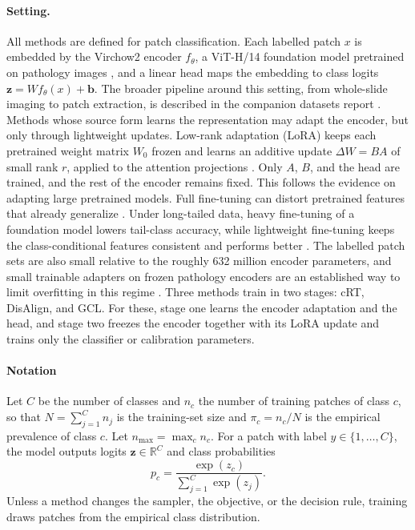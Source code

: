\documentclass[11pt]{article}
\begin{document}
\paragraph{Setting.}
All methods are defined for patch classification. Each labelled patch $x$ is embedded by the Virchow2 encoder $f_\theta$, a ViT-H/14 foundation model pretrained on pathology images \citep{zimmermann2024virchow2}, and a linear head maps the embedding to class logits $\mathbf z=W f_\theta(x)+\mathbf b$. The broader pipeline around this setting, from whole-slide imaging to patch extraction, is described in the companion datasets report \citep{queisler2026datasets}. Methods whose source form learns the representation may adapt the encoder, but only through lightweight updates. Low-rank adaptation (LoRA) keeps each pretrained weight matrix $W_0$ frozen and learns an additive update $\Delta W=BA$ of small rank $r$, applied to the attention projections \citep{hu2022lora}. Only $A$, $B$, and the head are trained, and the rest of the encoder remains fixed. This follows the evidence on adapting large pretrained models. Full fine-tuning can distort pretrained features that already generalize \citep{kumar2022fineTuning}. Under long-tailed data, heavy fine-tuning of a foundation model lowers tail-class accuracy, while lightweight fine-tuning keeps the class-conditional features consistent and performs better \citep{shi2024longTail}. The labelled patch sets are also small relative to the roughly \num{632} million encoder parameters, and small trainable adapters on frozen pathology encoders are an established way to limit overfitting in this regime \citep{hasan2025fmsWith}. Three methods train in two stages: cRT, DisAlign, and GCL. For these, stage one learns the encoder adaptation and the head, and stage two freezes the encoder together with its LoRA update and trains only the classifier or calibration parameters.

\paragraph{Notation}
Let $C$ be the number of classes and $n_c$ the number of training patches of class $c$, so that $N=\sum_{j=1}^{C}n_j$ is the training-set size and $\pi_c=n_c/N$ is the empirical prevalence of class $c$. Let $n_{\max}=\max_c n_c$. For a patch with label $y\in\{1,\ldots,C\}$, the model outputs logits $\mathbf z\in\mathbb R^{C}$ and class probabilities
\begin{equation}
  p_c=\frac{\exp(z_c)}{\sum_{j=1}^{C}\exp(z_j)}.
  \label{eq:softmax}
\end{equation}
\noindent Unless a method changes the sampler, the objective, or the decision rule, training draws patches from the empirical class distribution.
\end{document}
